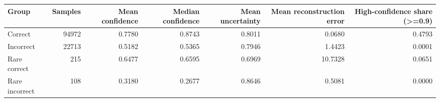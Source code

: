 \begin{tabular}{lrrrrrr}
\toprule
Group & Samples & Mean confidence & Median confidence & Mean uncertainty & Mean reconstruction error & High-confidence share (>=0.9) \\
\midrule
Correct & 94972 & 0.7780 & 0.8743 & 0.8011 & 0.0680 & 0.4793 \\
Incorrect & 22713 & 0.5182 & 0.5365 & 0.7946 & 1.4423 & 0.0001 \\
Rare correct & 215 & 0.6477 & 0.6595 & 0.6969 & 10.7328 & 0.0651 \\
Rare incorrect & 108 & 0.3180 & 0.2677 & 0.8646 & 0.5081 & 0.0000 \\
\bottomrule
\end{tabular}
